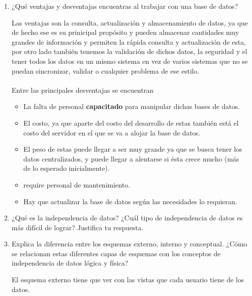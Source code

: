\documentclass[12pt,a4paper]{article}
\begin{document}
\begin{enumerate}
\begin{enumerate}
			\item ¿Qué ventajas y desventajas encuentras al trabajar con una base de datos?
			
                        	Las ventajas son la consulta, actualización y almacenamiento de datos, ya que de hecho ese es su prinicipal propósito y 			        pueden almacenar cantidades muy grandes de información y permiten la rápida consulta y actualización de esta, por otro                                   lado también tenemos la validación de dichos datos, la seguridad y el tener todos los datos en un mismo sistema en vez                                   de varios sistemas que no se puedan sincronizar, validar o cualquier problema de ese estilo.\\ \\
    
    			 	Entre las principales desventajas se encuentran\\
      				\begin{itemize}
     				\item La falta de personal \textbf{capacitado} para manipular dichas bases de datos.
   			        \item El costo, ya que aparte del costo del desarrollo de estas también está el costo del servidor en el que se va a 	                                 alojar la base de datos.
    				\item El peso de estas puede llegar a ser muy grande ya que se busca tener los datos centralizados, y puede llegar a                                     alentarse si ésta crece mucho (más de lo esperado inicialmente).
   			        \item require personal de mantenimiento.
                                \item Hay que actualizar la base de datos según las necesidades lo requieran.
                                \end{itemize}				
				
			\item ¿Qué es la independencia de datos? ¿Cuál tipo de independencia de datos es más difícil de lograr?
				Justifica tu respuesta.

			\item Explica la diferencia entre los esquemas externo, interno y conceptual. ¿Cómo se relacionan estas
				diferentes capas de esquemas con los conceptos de independencia de datos lógica y física?

				El esquema externo tiene que ver con las vistas que cada usuario tiene de los datos.
				

\end{enumerate}
\end{enumerate}
\end{document}
